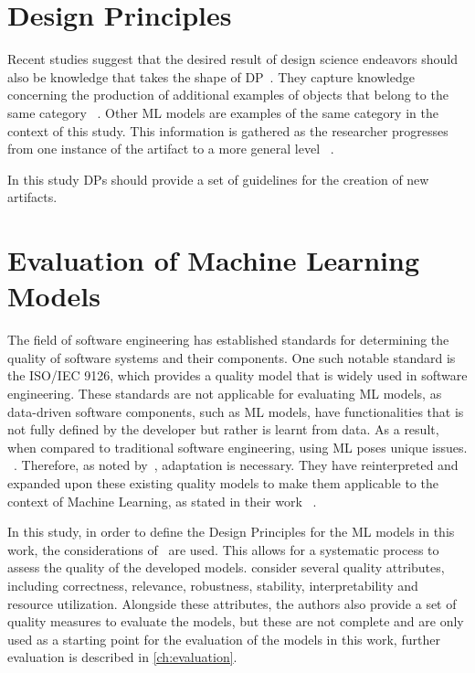 \section{Design Principles}\label{sec:design-principles}
Recent studies suggest that the desired result of design science endeavors should also be knowledge that takes the
shape of
\ac{DP}~\cite{baskerville2010explanatory, sein2011action, gregor_positioningpresentingdesign_2013}.
They capture knowledge concerning the production of additional examples of objects that belong to the same
category
~\cite[p. 39]{sein2011action}.
Other ML models are examples of the same category in the context of this study.
This information is gathered as the researcher progresses from one instance of the artifact to a more general level
~\cite[p. 37]{chandra2016making}.

In this study \ac{DP}s should provide a set of guidelines for the creation of new artifacts.


\section{Evaluation of Machine Learning Models}\label{sec:evaluation-of-machine-learning-models}
The field of software engineering has established standards for determining the quality of software systems and their
components.
One such notable standard is the ISO/IEC 9126, which provides a quality model that is widely used in
software engineering.
These standards are not applicable for evaluating \ac{ML} models, as data-driven software components, such
as \ac{ML} models, have functionalities that is not fully defined by the developer but rather is learnt from data.
As a result, when compared to traditional software engineering, using ML poses unique issues.
~\cite[p. 2]{siebert2022construction}.
Therefore, as noted by~\cite{siebert2022construction}, adaptation is necessary.
They have reinterpreted and expanded upon these existing quality models to make them applicable to the context of
Machine Learning, as stated in their work
~\cite[p. 1]{siebert2022construction}.

In this study, in order to define the Design Principles for the \ac{ML} models in this work, the
considerations of~\cite[]{siebert2022construction} are used.
This allows for a systematic process to assess the quality of the developed models.
\cite{siebert2022construction} consider several quality attributes, including
correctness, relevance, robustness, stability, interpretability and resource utilization.
Alongside these attributes, the authors also provide a set of quality measures to evaluate the
models, but these are not complete and are only used as a starting point for the evaluation of the
models in this work, further evaluation is described in \cref{ch:evaluation}.


